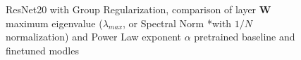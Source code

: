 \begin{figure}[H]
   \centering
   \caption{
     ResNet20 with Group Regularization, comparison of layer $\mathbf{W}$ maximum eigenvalue  ($\lambda_{max}$, or Spectral Norm *with $1/N$ normalization) and 
     Power Law exponent $\alpha$ pretrained baseline and finetuned modles
           }
   \label{fig:resnet204D5L}
\end{figure}

